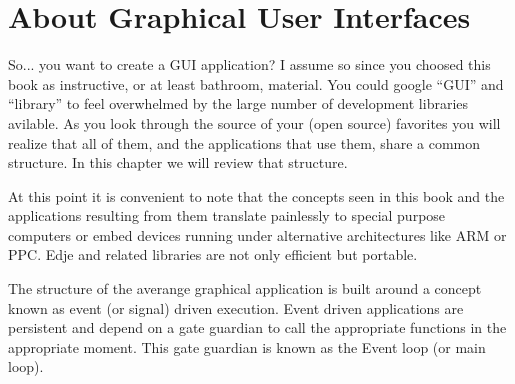 \documentclass[12pt,a4paper,english]{book}
\begin{document}

\hypertarget{about-graphical-user-interfaces}{}
\chapter{About Graphical User Interfaces}

So... you want to create a GUI application? I assume so since you choosed this
book as instructive, or at least bathroom, material. You could google ``GUI'' and
``library'' to feel overwhelmed by the large number of development libraries
avilable. As you look through the source of your (open source) favorites you
will realize that all of them, and the applications that use them, share a
common structure. In this chapter we will review that structure.

At this point it is convenient to note that the concepts seen in this book and
the applications resulting from them translate painlessly to special purpose
computers or embed devices running under alternative architectures like ARM or
PPC. Edje and related libraries are not only efficient but portable.

The structure of the averange graphical application is built around a concept
known as event (or signal) driven execution. Event driven applications are
persistent and depend on a gate guardian to call the appropriate functions in
the appropriate moment. This gate guardian is known as the Event loop (or main
loop).

{\hfill{}\hfill}
\end{document}
